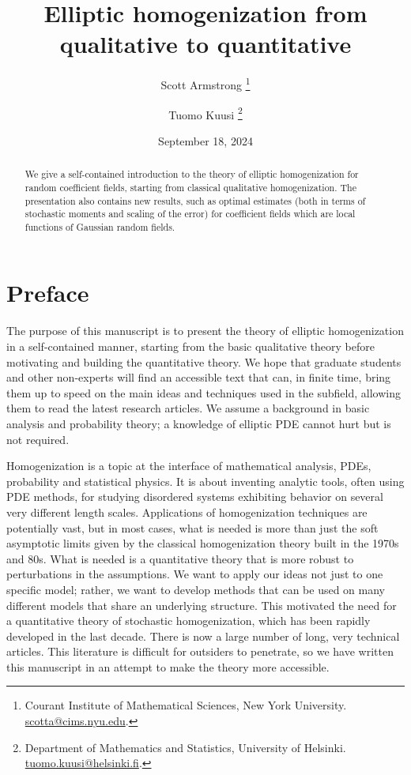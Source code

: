 \documentclass[11pt,twoside]{article} %
\title{\bf \Large Elliptic homogenization from qualitative to quantitative}
\author{Scott Armstrong
\thanks{Courant Institute of Mathematical Sciences, New York University.
{\footnotesize \href{mailto:scotta@cims.nyu.edu}{scotta@cims.nyu.edu}.}
}
\and 
Tuomo Kuusi
\thanks{Department of Mathematics and Statistics, University of Helsinki.
{\footnotesize \href{mailto:tuomo.kuusi@helsinki.fi}{tuomo.kuusi@helsinki.fi}.}
}
}
\date{September 18, 2024}
\numberwithin{equation}{section}
\theoremstyle{definition}
\begin{document}
\maketitle

\begin{abstract}
We give a self-contained introduction to the theory of elliptic homogenization for random coefficient fields, starting from classical qualitative homogenization. The presentation also contains new results, such as optimal estimates (both in terms of stochastic moments and scaling of the error) for coefficient fields which are local functions of Gaussian random fields.  
\end{abstract}

\setcounter{tocdepth}{2}  
\tableofcontents

\setcounter{section}{-1}  



\section{Preface}
  
The purpose of this manuscript is to present the theory of elliptic homogenization in a self-contained manner, starting from the basic qualitative theory before motivating and building the quantitative theory. We hope that graduate students and other non-experts will find an accessible text that can, in finite time, bring them up to speed on the main ideas and techniques used in the subfield, allowing them to read the latest research articles. We assume a background in basic analysis and probability theory; a knowledge of elliptic PDE cannot hurt but is not required. 

\smallskip

Homogenization is a topic at the interface of mathematical analysis, PDEs, probability and statistical physics. It is about inventing analytic tools, often using PDE methods, for studying disordered systems exhibiting behavior on several very different length scales.
Applications of homogenization techniques are potentially vast, but in most cases, what is needed is more than just the soft asymptotic limits given by the classical homogenization theory built in the 1970s and 80s. What is needed is a quantitative theory that is more robust to perturbations in the assumptions. We want to apply our ideas not just to one specific model; rather, we want to develop methods that can be used on many different models that share an underlying structure. 
This motivated the need for a quantitative theory of stochastic homogenization, which has been rapidly developed in the last decade. There is now a large number of long, very technical articles. This literature is difficult for outsiders to penetrate, so we have written this manuscript in an attempt to make the theory more accessible.
 
\end{document}
